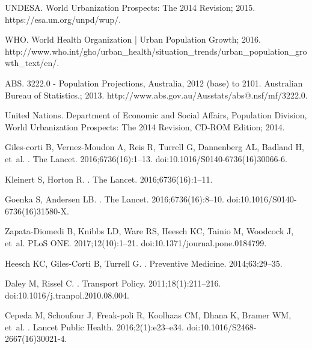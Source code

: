 UNDESA. {World Urbanization Prospects: The 2014 Revision}; 2015.
\newblock https://esa.un.org/unpd/wup/.

WHO. {World Health Organization | Urban Population Growth}; 2016.
\newblock
  http://www.who.int/gho/urban{\_}health/situation{\_}trends/urban{\_}population{\_}growth{\_}text/en/.

ABS. {3222.0 - Population Projections, Australia, 2012 (base) to 2101.
  Australian Bureau of Statistics.}; 2013.
\newblock http://www.abs.gov.au/Ausstats/abs@.nsf/mf/3222.0.

{United Nations}. {Department of Economic and Social Affairs, Population
  Division, World Urbanization Prospects: The 2014 Revision, CD-ROM Edition};
  2014.

Giles-corti B, Vernez-Moudon A, Reis R, Turrell G, Dannenberg AL, Badland H,
  et~al.
.
\newblock The Lancet. 2016;6736(16):1--13.
\newblock doi:{10.1016/S0140-6736(16)30066-6}.

Kleinert S, Horton R.
.
\newblock The Lancet. 2016;6736(16):1--11.

Goenka S, Andersen LB.
.
\newblock The Lancet. 2016;6736(16):8--10.
\newblock doi:{10.1016/S0140-6736(16)31580-X}.

Zapata-Diomedi B, Knibbs LD, Ware RS, Heesch KC, Tainio M, Woodcock J, et~al.
\newblock PLoS ONE. 2017;12(10):1--21.
\newblock doi:{10.1371/journal.pone.0184799}.

Heesch KC, Giles-Corti B, Turrell G.
.
\newblock Preventive Medicine. 2014;63:29--35.

Daley M, Rissel C.
.
\newblock Transport Policy. 2011;18(1):211--216.
\newblock doi:{10.1016/j.tranpol.2010.08.004}.

Cepeda M, Schoufour J, Freak-poli R, Koolhaas CM, Dhana K, Bramer WM, et~al.
.
\newblock Lancet Public Health. 2016;2(1):e23--e34.
\newblock doi:{10.1016/S2468-2667(16)30021-4}.

